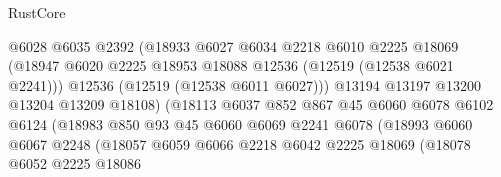 \begin{lexlean}{RustCore}
\begin{coremodule}
                                    @6028
                                    @6035
                                    @2392
                                    (@18933
                                      @6027
                                      @6034
                                      @2218
                                      @6010
                                      @2225
                                      @18069
                                      (@18947
                                        @6020
                                        @2225
                                        @18953
                                        @18088
                                        @12536
                                        (@12519 (@12538 @6021 @2241)))
                                      @12536
                                      (@12519 (@12538 @6011 @6027)))
                                    @13194
                                    @13197
                                    @13200
                                    @13204
                                    @13209
                                    @18108)
                                  (@18113
                                    @6037
                                    @852
                                    @867
                                    @45
                                    @6060
                                    @6078
                                    @6102
                                    @6124
                                    (@18983
                                      @850
                                      @93
                                      @45
                                      @6060
                                      @6069
                                      @2241
                                      @6078
                                      (@18993
                                        @6060
                                        @6067
                                        @2248
                                        (@18057
                                          @6059
                                          @6066
                                          @2218
                                          @6042
                                          @2225
                                          @18069
                                          (@18078
                                            @6052
                                            @2225
                                            @18086

\end{coremodule}
\end{lexlean}
